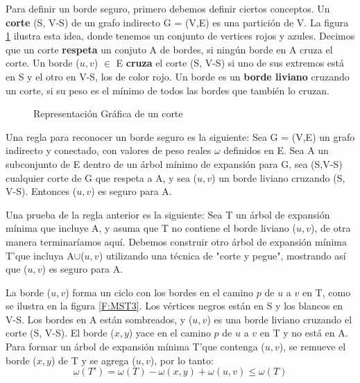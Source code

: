 \documentclass[a4paper, 11pt]{report}
\newcommand{\DrawEJcGraph}[5]{

    \begin{scope}[#5]
    \foreach \pos/\nodo in {{(0,0)/4}, {(0,1.8)/5}, {(1.1,1.3)/7}, {(2.6,2.6)/1}, {(2.6,0.6)/0}, {(4.1,1.3)/2}, {(4.1,2.6)/3}, {(6.6,0)/6}}
        \node[vertex] (#3\nodo) at \pos {\nodo};
    \foreach \start/\end in {4/5, 5/7, 7/1,7/0,0/2,2/3,2/6,4/7,1/5,0/4,1/2,1/3,2/7,3/6,6/0,6/4}
        \path[edge,#5] (#3\start) -- (#3\end);

    \foreach \nodo in {#1}
        \node[selected vertex] at (#3\nodo) {\nodo};

    \begin{pgfonlayer}{background}%
        \foreach \start/\end in {#2}
            \path[rojod edge,#5] (#3\start) -- (#3\end);
    \end{pgfonlayer}
    \begin{pgfonlayer}{background}%
        \foreach \start/\end in {#3}
            \path[rojog edge,#5] (#3\start) -- (#3\end);
    \end{pgfonlayer}
    \begin{pgfonlayer}{background}%
        \foreach \start/\end in {#4}
            \path[azul edge,#5] (#3\start) -- (#3\end);
    \end{pgfonlayer}
    \end{scope}

}
\begin{document}
Para definir un borde seguro, primero debemos definir ciertos conceptos. Un \textbf{corte} (S, V-S) de un grafo indirecto G = (V,E) es una partición de V. La figura \ref{MST2} ilustra esta idea, donde tenemos un conjunto de vertices rojos y azules. Decimos que un corte \textbf{respeta} un conjuto A de bordes, si ningún borde en A cruza el corte. Un borde ($u,v$) $\in$ E \textbf{cruza} el corte (S, V-S) si uno de sus extremos está en S y el otro en V-S, los de color rojo. Un borde es un \textbf{borde liviano} cruzando un corte, si su peso es el mínimo de todos las bordes que también lo cruzan.

\begin{figure}[!h]
    \centering
    \caption{Representaci\'on Gr\'afica de un corte}
    \label{MST2}
\end{figure}

Una regla para reconocer un borde seguro es la siguiente: Sea G = (V,E) un grafo indirecto y conectado, con valores de peso reales $\omega$ definidos en E. Sea A un subconjunto de E dentro de un árbol mínimo de expansión para G, sea (S,V-S) cualquier corte de G que respeta a A, y sea ($u, v$) un borde liviano cruzando (S, V-S). Entonces ($u, v$) es seguro para A.

Una prueba de la regla anterior es la siguiente:
Sea T un árbol de expansión mínima que incluye A, y asuma que T no contiene el borde liviano ($u,v$), de otra manera terminaríamos aquí. Debemos construir otro árbol de expansión mínima T'que incluya A$\cup${($u,v$)} utilizando una técnica de "corte y pegue", mostrando así que ($u,v$) es seguro para A.

La borde ($u, v$) forma un ciclo con los bordes en el camino $p$ de $u$ a $v$ en T, como se ilustra en la figura \ref{F:MST3}. Los vértices negros están en S y los blancos en V-S. Los bordes en A están sombreados, y ($u, v$) es una borde liviano cruzando el corte (S, V-S). El borde ($x, y$) yace en el camino $p$ de $u$ a $v$ en T y no está en A. Para formar un árbol de expansión mínima T'que contenga ($u, v$), se remueve el borde ($x, y$) de T y se agrega ($u, v$), por lo tanto:
\begin{equation}
\omega(T') = \omega(T) - \omega(x,y) + \omega(u,v)\leq \omega(T) 
\end{equation}
\end{document}
